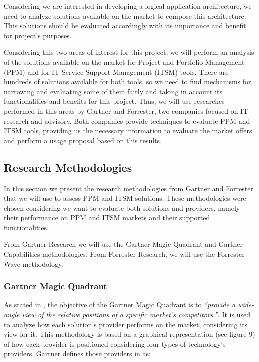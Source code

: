 Considering we are interested in developing a logical application architecture, we need to analyze solutions available on the market to compose this architecture. This solutions should be evaluated accordingly with its importance and benefit for project's purposes.\par
Considering this two areas of interest for this project, we will perform an analysis of the solutions available on the market for Project and Portfolio Management (PPM) and for IT Service Support Management (ITSM) tools. There are hundreds of solutions available for both tools, so we need to find mechanisms for narrowing and evaluating some of them fairly and taking in account its functionalities and benefits for this project. Thus, we will use researches performed in this areas by Gartner and Forrester, two companies focused on IT research and advisory. Both companies provide techniques to evaluate PPM and ITSM tools, providing us the necessary information to evaluate the market offers and perform a usage proposal based on this results.\par

\subsection{Research Methodologies}

In this section we present the research methodologies from Gartner and Forrester that we will use to assess PPM and ITSM solutions. These methodologies were chosen considering we want to evaluate both solutions and providers, namely their performance on PPM and ITSM markets and their supported functionalities.\par
From Gartner Research we will use the Gartner Magic Quadrant and Gartner Capabilities methodologies. From Forrester Research, we will use the Forrester Wave methodology.\par

\subsubsection{Gartner Magic Quadrant}

As stated in \cite{GartnerMagicQuadrant}, the objective of the Gartner Magic Quadrant is to \textit{``provide a wide-angle view of the relative positions of a specific market's competitors.''}. It is used to analyze how each solution's provider performs on the market, considering its view for it. This methodology is based on a graphical representation (see figure 9) of how each provider is positioned considering four types of technology's providers. Gartner defines those providers in \cite{GartnerMagicQuadrant} as:

